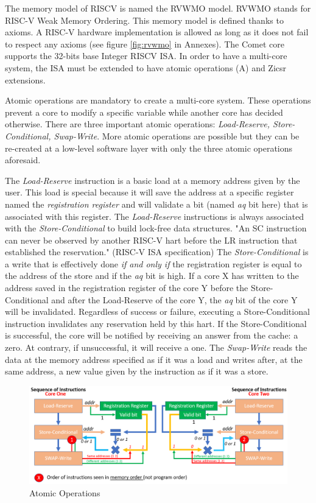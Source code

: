 \documentclass[10pt,letterpaper]{article}
\begin{document}
The memory model of RISCV is named the RVWMO model. RVWMO stands for RISC-V Weak Memory Ordering. This memory model is defined thanks to axioms. A RISC-V hardware implementation is allowed as long as it does not fail to respect any axioms (see figure \ref{fig:rvwmo} in Annexes). The Comet core supports the 32-bits base Integer RISCV ISA. In order to have a multi-core system, the ISA must be extended to have atomic operations (A) and Zicsr extensions.

Atomic operations are mandatory to create a multi-core system. These operations prevent a core to modify a specific variable while another core has decided otherwise. There are three important atomic operations: \textit{Load-Reserve, Store-Conditional, Swap-Write}. More atomic operations are possible but they can be re-created at a low-level software layer with only the three atomic operations aforesaid. 

The \textit{Load-Reserve} instruction is a basic load at a memory address given by the user. This load is special because it will save the address at a specific register named the \textit{registration register} and will validate a bit (named \textit{aq} bit here) that is associated with this register. The \textit{Load-Reserve} instructions is always associated with the \textit{Store-Conditional} to build lock-free data structures. "An SC instruction can never be observed by another RISC-V hart before the LR instruction that established the reservation." (RISC-V ISA specification) The \textit{Store-Conditional} is a write that is effectively done \textit{if and only if} the registration register is equal to the address of the store and if the \textit{aq} bit is high. If a core X has written to the address saved in the registration register of the core Y before the Store-Conditional and after the Load-Reserve of the core Y, the \textit{aq} bit of the core Y will be invalidated. Regardless of success or failure, executing a Store-Conditional instruction invalidates any reservation held by this hart. If the Store-Conditional is successful, the core will be notified by receiving an answer from the cache: a zero. At contrary, if unsuccessful, it will receive a one. The \textit{Swap-Write} reads the data at the memory address specified as if it was a load and writes after, at the same address, a new value given by the instruction as if it was a store.

\begin{figure}[H]
\centering
\includegraphics[width=14cm]{img/multi_proc/atomic_op.PNG}
\caption{Atomic Operations}
\label{fig:atomicop}
\end{figure}
\end{document}
